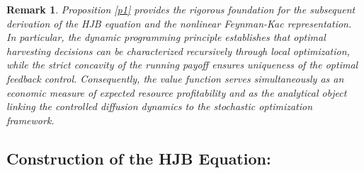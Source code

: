 \documentclass[11pt]{article}
\newtheorem{rmk}[remark]{\bf Remark}
\begin{document}
	\begin{rmk}
		Proposition \ref{p1} provides the rigorous foundation for the subsequent derivation of the HJB equation and the nonlinear Feynman-Kac representation. In particular, the dynamic programming principle establishes that optimal harvesting decisions can be characterized recursively through local optimization, while the strict concavity of the running payoff ensures uniqueness of the optimal feedback control. Consequently, the value function serves simultaneously as an economic measure of expected resource profitability and as the analytical object linking the controlled diffusion dynamics to the stochastic optimization framework.
	\end{rmk}
	
	\subsection{Construction of the HJB Equation:}
	
\end{document}
